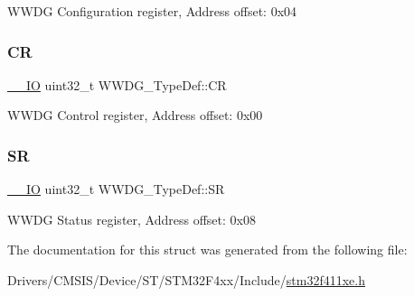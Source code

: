 W\+W\+DG Configuration register, Address offset\+: 0x04 \mbox{\label{struct_w_w_d_g___type_def_a4caf530d45f7428c9700d9c0057135f8}} 
\subsubsection{\texorpdfstring{CR}{CR}}
{\footnotesize\ttfamily \hyperlink{core__sc300_8h_aec43007d9998a0a0e01faede4133d6be}{\+\_\+\+\_\+\+IO} uint32\+\_\+t W\+W\+D\+G\+\_\+\+Type\+Def\+::\+CR}

W\+W\+DG Control register, Address offset\+: 0x00 \mbox{\label{struct_w_w_d_g___type_def_a15655cda4854cc794db1f27b3c0bba38}} 
\subsubsection{\texorpdfstring{SR}{SR}}
{\footnotesize\ttfamily \hyperlink{core__sc300_8h_aec43007d9998a0a0e01faede4133d6be}{\+\_\+\+\_\+\+IO} uint32\+\_\+t W\+W\+D\+G\+\_\+\+Type\+Def\+::\+SR}

W\+W\+DG Status register, Address offset\+: 0x08 

The documentation for this struct was generated from the following file\+:\begin{DoxyCompactItemize}
\item 
Drivers/\+C\+M\+S\+I\+S/\+Device/\+S\+T/\+S\+T\+M32\+F4xx/\+Include/\hyperlink{stm32f411xe_8h}{stm32f411xe.\+h}\end{DoxyCompactItemize}
